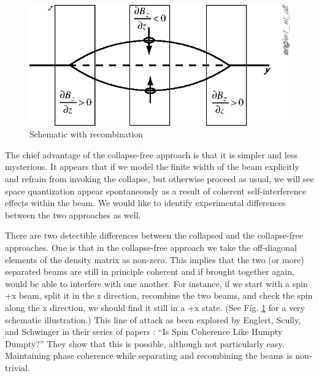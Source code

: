 \documentclass[aps,prl,superscriptaddress,12pt]{revtex4-2}
\begin{document}
\begin{figure}
\includegraphics{englert_et_al3_small.eps}	
\caption{\label{fig: englert:et:al} {Schematic \sg with recombination}}
\end{figure}

The chief advantage of the collapse-free approach 
	is that it is simpler and less mysterious.
It appears that if we model the finite width of the beam explicitly 
	and refrain from invoking the collapse, but otherwise proceed as usual, 
	we will see space quantization appear spontaneously
	as a result of coherent self-interference effects within the beam.
We would like to identify experimental differences between the two approaches as well.

There are two detectible differences between the collapsed and the collapse-free approaches.
One is that in the collapse-free approach 
	we take the off-diagonal elements of the density matrix as non-zero.
This implies that the two (or more) separated beams are still in principle coherent 
	and if brought together again, would be able to interfere with one another.
For instance, if we start with a spin +x beam, split it in the z direction, 
	recombine the two beams, and check the spin along the x direction, 
	we should find it still in a +x state.
(See Fig. \ref{fig: englert:et:al} for a very schematic illustration.)
This line of attack as been explored by Englert, Scully, and Schwinger
	 in their series of papers
	\cite{Englert:1988,Schwinger:1988,Scully:1989a}:  
	``Is Spin Coherence Like Humpty Dumpty?'' 
They show that this is possible, 
	although not particularly easy.
Maintaining phase coherence while separating and recombining the beams is non-trivial.
\end{document}
